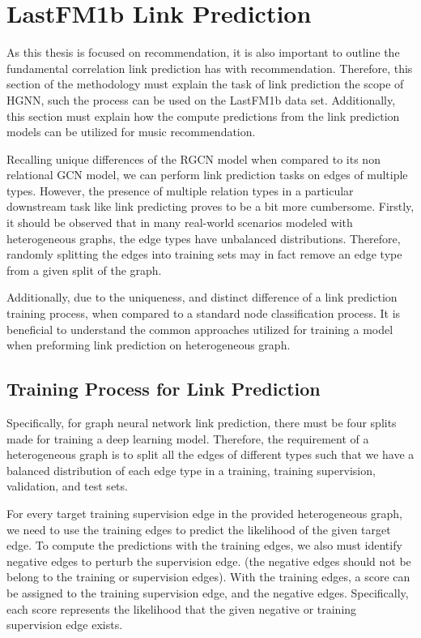 \section{LastFM1b Link Prediction}


As this thesis is focused on recommendation, it is also important to outline the fundamental correlation link prediction has with recommendation. Therefore, this section of the methodology must explain the task of link prediction the scope of HGNN, such the process can be used on the LastFM1b data set. Additionally, this section must explain how the compute predictions from the link prediction models can be utilized for music recommendation.

Recalling unique differences of the RGCN model when compared to its non relational GCN model, we can perform link prediction tasks on edges of multiple types. However, the presence of multiple relation types in a particular downstream task like link predicting proves to be a bit more cumbersome. Firstly, it should be observed that in many real-world scenarios modeled with heterogeneous graphs, the edge types have unbalanced distributions. Therefore, randomly splitting the edges into training sets may in fact remove an edge type from a given split of the graph. 

Additionally, due to the uniqueness, and distinct difference of a link prediction training process, when compared to a standard node classification process. It is beneficial to understand the common approaches utilized for training a model when preforming link prediction on heterogeneous graph.


\subsection{Training Process for Link Prediction}

Specifically, for graph neural network link prediction, there must be four splits made for training a deep learning model. Therefore, the requirement of a heterogeneous graph is to split all the edges of different types such that we have a balanced distribution of each edge type in a training, training supervision, validation, and test sets. 
\cite{CS224W}


For every target training supervision edge in the provided heterogeneous graph, we need to use the training edges to predict the likelihood of the given target edge. To compute the predictions with the training edges, we also must identify negative edges to perturb the supervision edge. \cite{CS224W} (the negative edges should not be belong to the training or supervision edges). With the training edges, a score can be assigned to the training supervision edge, and the negative edges. Specifically, each score represents the likelihood that the given negative or training supervision edge exists. 

